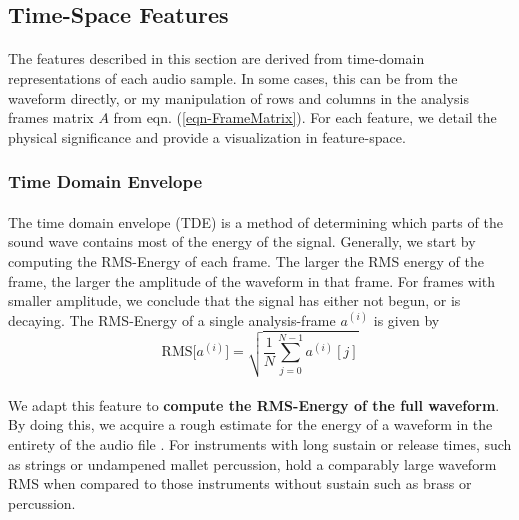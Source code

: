 \documentclass[12pt,letterpaper]{article}
\begin{document}

\newpage

\subsection{Time-Space Features}
\label{subsec-time}

\paragraph*{}The features described in this section are derived from time-domain representations of each audio sample. In some cases, this can be from the waveform directly, or my manipulation of rows and columns in the analysis frames matrix $A$ from eqn. (\ref{eqn-FrameMatrix}). For each feature, we detail the physical significance and provide a visualization in feature-space.

\subsubsection{Time Domain Envelope}

\paragraph*{}The time domain envelope (TDE) is a method of determining which parts of the sound wave contains most of the energy of the signal. Generally, we start by computing the RMS-Energy of each frame. The larger the RMS energy of the frame, the larger the amplitude of the waveform in that frame. For frames with smaller amplitude, we conclude that the signal has either not begun, or is decaying. The RMS-Energy of a single analysis-frame $a^{(i)}$ is given by \cite{Olson,Virtanen}
\begin{equation}
\label{eqn-RMS}
\text{RMS}\big[ a^{(i)} \big] = \sqrt{\frac{1}{N} \sum_{j=0}^{N-1}a^{(i)}[j]}
\end{equation}

\paragraph*{}We adapt this feature to \textbf{compute the RMS-Energy of the full waveform}. By doing this, we acquire a rough estimate for the energy of a waveform in the entirety of the audio file \cite{Liu}. For instruments with long sustain or release times, such as strings or undampened mallet percussion, hold a comparably large waveform RMS when compared to those instruments without sustain such as brass or percussion.
\end{document}
